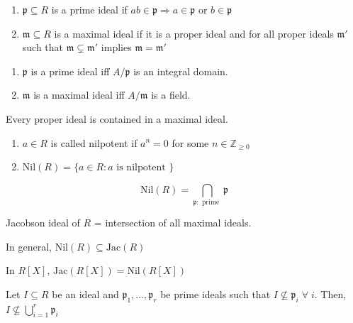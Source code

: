 \documentclass[oneside, 12pt]{scrbook}
\newcommand{\ZZ}{\mathbb Z}
\newcommand{\pr}{\mathfrak{p}}
\newcommand{\m}{\mathfrak{m}}
\newcommand{\nil}{\mathrm{Nil}}
\theoremstyle{theorem}
\begin{document}
\begin{definition}
\begin{enumerate}
\item $\pr \subseteq R$ is a prime ideal if $ab \in \pr \Rightarrow a \in \pr$ or $b \in \pr$
\item $\m \subseteq R$ is a maximal ideal if it is a proper ideal and for all proper ideals $\m'$ such that $\m \subsetneq \m'$ implies $\m = \m'$
\end{enumerate}
\end{definition}

\begin{proposition}
\begin{enumerate}
\item $\pr$ is a prime ideal iff $A/\pr$ is an integral domain. 
\item $\m$ is a maximal ideal iff $A/\m$ is a field.
\end{enumerate}
\end{proposition}

\begin{theorem}
Every proper ideal is contained in a maximal ideal.
\end{theorem}

\begin{definition}
\begin{enumerate}
\item $a\in R$ is called nilpotent if $a^n = 0$ for some $n \in\ZZ_{\geq 0}$
\item $\nil(R) = \{a \in R : a \text{ is nilpotent }\}$
\end{enumerate}
\end{definition}

\begin{theorem}
\begin{equation}
\nil(R) = \bigcap_{\pr : \text{ prime }} \pr
\end{equation}
\end{theorem}

\begin{definition}
Jacobson ideal of $R$ = intersection of all maximal ideals. 
\end{definition}

In general, $\nil(R) \subseteq \mathrm{Jac}(R)$

\begin{exercise}
In $R[X]$, $\mathrm{Jac}(R[X]) = \nil(R[X])$
\end{exercise}

\begin{theorem}
Let $I \subseteq R$ be an ideal and $\pr_{1}, \hdots , \pr_{r}$ be prime ideals such that $I \not \subseteq \pr_{i} \;\forall \; i$. Then, $I \not \subseteq \bigcup_{i=1}^{r} \pr_{i}$
\end{theorem}
\end{document}
